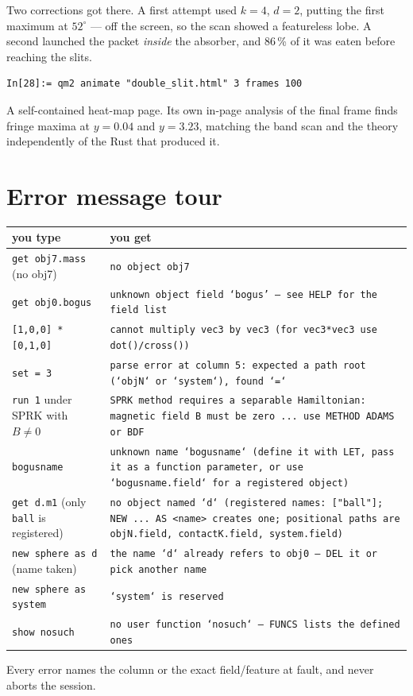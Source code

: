 \documentclass[11pt]{article}
\newcommand{\code}[1]{\texttt{#1}}
\begin{document}
Two corrections got there. A first attempt used $k=4$, $d=2$, putting the
first maximum at $52^\circ$ --- off the screen, so the scan showed a
featureless lobe. A second launched the packet \emph{inside} the
absorber, and 86\,\% of it was eaten before reaching the slits.

\begin{lstlisting}
In[28]:= qm2 animate "double_slit.html" 3 frames 100
\end{lstlisting}

A self-contained heat-map page. Its own in-page analysis of the final
frame finds fringe maxima at $y=0.04$ and $y=3.23$, matching the band
scan and the theory independently of the Rust that produced it.

\section{Error message tour}

\begin{center}
\begin{tabular}{p{5.4cm}p{9.2cm}}
\textbf{you type} & \textbf{you get}\\\hline
\code{get obj7.mass} (no obj7) & \code{no object obj7}\\
\code{get obj0.bogus} & \code{unknown object field `bogus' --- see HELP for the field list}\\
\code{[1,0,0] * [0,1,0]} & \code{cannot multiply vec3 by vec3 (for vec3*vec3 use dot()/cross())}\\
\code{set = 3} & \code{parse error at column 5: expected a path root (`objN` or `system`), found `=`}\\
\code{run 1} under SPRK with $B\ne0$ & \code{SPRK method requires a separable Hamiltonian: magnetic field B must be zero ... use METHOD ADAMS or BDF}\\
\code{bogusname} & \code{unknown name `bogusname` (define it with LET, pass it as a function parameter, or use `bogusname.field` for a registered object)}\\
\code{get d.m1} (only \code{ball} is registered) & \code{no object named `d` (registered names: ["ball"]; NEW ... AS <name> creates one; positional paths are objN.field, contactK.field, system.field)}\\
\code{new sphere as d} (name taken) & \code{the name `d` already refers to obj0 --- DEL it or pick another name}\\
\code{new sphere as system} & \code{`system` is reserved}\\
\code{show nosuch} & \code{no user function `nosuch` --- FUNCS lists the defined ones}\\
\end{tabular}
\end{center}

Every error names the column or the exact field/feature at fault, and
never aborts the session.
\end{document}
